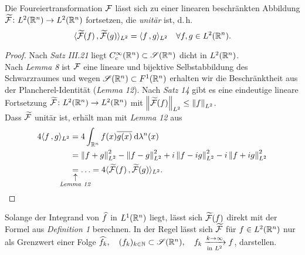 \documentclass[skript.tex]{subfiles}
\begin{document}
	\begin{theorem}[Plancherel]
		Die Foureiertransformation $\mathcal{F}$ lässt sich zu einer linearen beschränkten Abbildung $\widetilde{\mathcal{F}} \colon L^2(\mathbb{R}^n) \to L^2(\mathbb{R}^n)$ fortsetzen, die \emph{unitär} ist, d.\,h.
		\[
			\langle \widetilde{\mathcal{F}}(f)\,{,}\,\widetilde{\mathcal{F}}(g) \rangle_{L^2}
			= \langle f\,{,}\,g \rangle_{L^2} \quad \forall f,g\in L^2(\mathbb{R}^n).
		\]
	\end{theorem}
	\begin{proof}
		Nach \emph{Satz III.21} liegt $C_c^\infty(\mathbb{R}^n) \subset \mathscr{S}(\mathbb{R}^n)$ dicht in $L^2(\mathbb{R}^n)$.\\
		Nach \emph{Lemma 8} ist $\mathcal{F}$ eine lineare und bijektive Selbstabbildung des Schwarzraumes und wegen $\mathscr{S}(\mathbb{R}^n) \subset F^1(\mathbb{R}^n)$ erhalten wir die Beschränktheit aus der Plancherel-Identität (\emph{Lemma 12}). Nach \emph{Satz 14} gibt es eine eindeutige lineare Fortsetzung $\widetilde{\mathcal{F}} \colon L^2(\mathbb{R}^n) \to L^2(\mathbb{R}^n)$ mit $\left\lVert \widetilde{\mathcal{F}}(f) \right\rVert_{L^2} \leq \left\lVert f \right\rVert_{L^2}$.\\
		Dass $\widetilde{\mathcal{F}}$ unitär ist, erhält man mit \emph{Lemma 12} aus
		\begin{align*}
			4\skp{f}{g}_{L^2} &= 4 \int_{\R^n}f(x)\ol{g(x)} \md\lambda^n(x) \\
			&= \norm{f+g}_{L^2}^2 - \norm{f-g}_{L^2}^2 + i\norm{f-ig}_{L^2}^2 - i\norm{f+ig}_{L^2}^2 \\
			&\uarrow{\text{\emph{Lemma 12}}}{=} \dotso = 4\skp{\wt{\F}(f)}{\wt{\F}(g)}_{L^2}.
		\end{align*}
	\end{proof}
	\begin{bem*}
		Solange der Integrand von $\widehat{f}$ in $L^1(\mathbb{R}^n)$ liegt, lässt sich $\widetilde{\mathcal{F}}(f)$ direkt mit der Formel aus \emph{Definition 1} berechnen. In der Regel lässt sich $\widetilde{\mathcal{F}}$ für $f \in L^2(\mathbb{R}^n)$ nur als Grenzwert einer Folge $\widehat{f_k}, \quad(f_k)_{k\in\mathbb{N}} \subset \mathscr{S}(\mathbb{R}^n),\quad f_k \xrightarrow[\text{in }L^2]{k\to\infty}f$, darstellen.
	\end{bem*}
\end{document}
